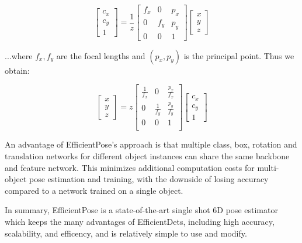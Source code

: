 \begin{equation}
    \begin{bmatrix}
        c_x\\c_y\\1
    \end{bmatrix}
    = \frac{1}{z}
    \begin{bmatrix}
        f_x & 0 & p_x \\
        0 & f_y & p_y \\
        0 & 0 & 1 
    \end{bmatrix}
    \begin{bmatrix}
        x\\y\\z
    \end{bmatrix}
\end{equation}

...where $f_x, f_y$ are the focal lengths and $(p_x, p_y)$ is the principal point. Thus we obtain:

\begin{equation}
    \begin{bmatrix}
        x\\y\\z
    \end{bmatrix}
    =z
    \begin{bmatrix}
        \frac{1}{f_x} & 0 & \frac{p_x}{f_x} \\
        0 & \frac{1}{f_y} & \frac{p_y}{f_y} \\
        0 & 0 & 1 \\
    \end{bmatrix}
    \begin{bmatrix}
        c_x\\c_y\\1
    \end{bmatrix}
\end{equation}

An advantage of EfficientPose's approach is that multiple class, box, rotation and translation networks for different object instances can share the same backbone and feature network. This minimizes additional computation costs for multi-object pose estimation and training, with the downside of losing accuracy compared to a network trained on a single object. 

In summary, EfficientPose is a state-of-the-art single shot 6D pose estimator which keeps the many advantages of EfficientDets, including high accuracy, scalability, and efficency, and is relatively simple to use and modify.

